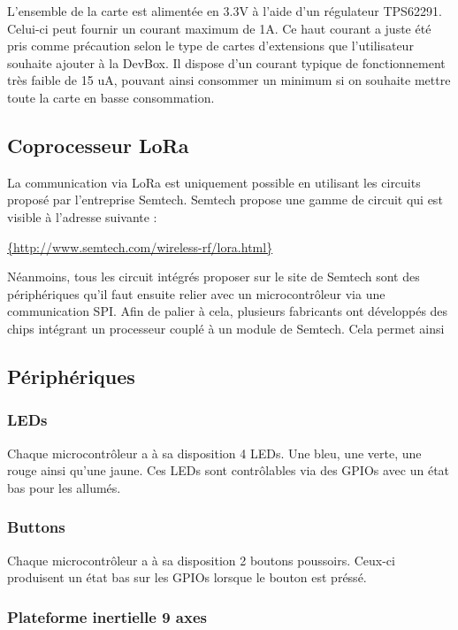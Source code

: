 L'ensemble de la carte est alimentée en 3.3V à l'aide d'un régulateur TPS62291. Celui-ci peut fournir un courant maximum de 1A. Ce haut courant a juste été pris comme précaution selon le type de cartes d'extensions que l'utilisateur souhaite ajouter à la DevBox. Il dispose d'un courant typique de fonctionnement très faible de 15 uA, pouvant ainsi consommer un minimum si on souhaite mettre toute la carte en basse consommation.

\subsection{Coprocesseur LoRa}

La communication via LoRa est uniquement possible en utilisant les circuits proposé par l'entreprise Semtech. Semtech propose une gamme de circuit qui est visible à l'adresse suivante : 
\begin{center}
    \url{{http://www.semtech.com/wireless-rf/lora.html}}
\end{center}

Néanmoins, tous les circuit intégrés proposer sur le site de Semtech sont des périphériques qu'il faut ensuite relier avec un microcontrôleur via une communication SPI. Afin de palier à cela, plusieurs fabricants ont développés des chips intégrant un processeur couplé à un module de Semtech. Cela permet ainsi 


\subsection{Périphériques}
\subsubsection{LEDs}

Chaque microcontrôleur a à sa disposition 4 LEDs. Une bleu, une verte, une rouge ainsi qu'une jaune. Ces LEDs sont contrôlables via des GPIOs avec un état bas pour les allumés. 

\subsubsection{Buttons}

Chaque microcontrôleur a à sa disposition 2 boutons poussoirs. Ceux-ci produisent un état bas sur les GPIOs lorsque le bouton est préssé.


\subsubsection{Plateforme inertielle 9 axes}

